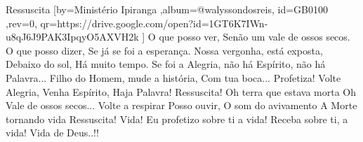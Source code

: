 \beginsong
{Ressuscita %
}[by={Ministério Ipiranga %
},album={@walyssondosreis},
id={GB0100 %
},rev={0}, %
qr={https://drive.google.com/open?id=1GT6K7IWn-u8qJ6J9PAK3IpqyO5AXVH2k %
}]
\beginverse*
O que posso ver,
Senão um vale de ossos secos.
O que posso dizer,
Se já se foi a esperança.
Nossa vergonha, está exposta,
Debaixo do sol, Há muito tempo.
Se foi a Alegria, não há Espírito, não há Palavra...
\endverse
\beginverse*
Filho do Homem, mude a história,
Com tua boca...
Profetiza!
Volte Alegria, Venha Espírito, Haja Palavra!
\endverse
\beginchorus
Ressuscita!
Oh terra que estava morta
Oh Vale de ossos secos...
Volte a respirar
Posso ouvir,
O som do avivamento
A Morte tornando vida
Ressuscita!
\endchorus
\beginverse*
Vida! Eu profetizo sobre ti a vida!
Receba sobre ti, a vida!
Vida de Deus..!!
\endverse
\vspace{4em} %
\begin{comment}
\lstset{basicstyle=\scriptsize\bf} %
\tab{Solo 1}
\begin{lstlisting}
E|-----------------------------------------------------|
B|-----------------------------------------------------|
G|-----------------------------------------------------|
D|-----------------------------------------------------|
A|-----------------------------------------------------|
E|-----------------------------------------------------|
\end{lstlisting}
\end{comment}
 
